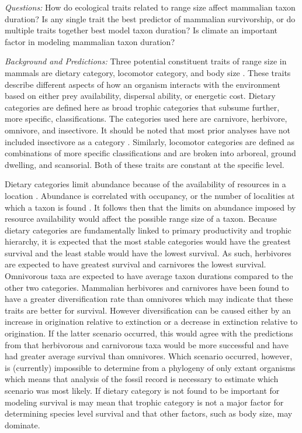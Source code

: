 \documentclass[12pt,letterpaper]{article}
\begin{document}
\textit{Questions:} 
How do ecological traits related to range size affect mammalian taxon duration? Is any single trait the best predictor of mammalian survivorship, or do multiple traits together best model taxon duration? Is climate an important factor in modeling mammalian taxon duration?

\textit{Background and Predictions:} 
Three potential constituent traits of range size in mammals are dietary category, locomotor category, and body size \citep{Smith2004,Smith2008b,Damuth1981a,Damuth1979,Jernvall2004,Lyons2005,Lyons2010}. These traits describe different aspects of how an organism interacts with the environment based on either prey availability, dispersal ability, or energetic cost. Dietary categories are defined here as broad trophic categories that subsume further, more specific, classifications. The categories used here are carnivore, herbivore, omnivore, and insectivore. It should be noted that most prior analyses have not included insectivore as a category \citep{Jernvall2004,Price2012}. Similarly, locomotor categories are defined as combinations of more specific classifications and are broken into arboreal, ground dwelling, and scansorial. Both of these traits are constant at the specific level. 

Dietary categories limit abundance because of the availability of resources in a location \citep{VanValen1989,Brown1987,Damuth1979,Silva1997,Janis2000}. Abundance is correlated with occupancy, or the number of localities at which a taxon is found \citep{Jernvall2002,Fortelius2002,Brown1984}. It follows then that the limits on abundance imposed by resource availability would affect the possible range size of a taxon. Because dietary categories are fundamentally linked to primary productivity and trophic hierarchy, it is expected that the most stable categories would have the greatest survival and the least stable would have the lowest survival. As such, herbivores are expected to have greatest survival and carnivores the lowest survival. Omnivorous taxa are expected to have average taxon durations compared to the other two categories. Mammalian herbivores and carnivores have been found to have a greater diversification rate than omnivores \citep{Price2012} which may indicate that these traits are better for survival. However diversification can be caused either by an increase in origination relative to extinction or a decrease in extinction relative to origination. If the latter scenario occurred, this would agree with the predictions from \citet{Price2012} that herbivorous and carnivorous taxa would be more successful and have had greater average survival than omnivores. Which scenario occurred, however, is (currently) impossible to determine from a phylogeny of only extant organisms \citep{Rabosky2010a} which means that analysis of the fossil record is necessary to estimate which scenario was most likely. If dietary category is not found to be important for modeling survival is may mean that trophic category is not a major factor for determining species level survival and that other factors, such as body size, may dominate. 
\end{document}
